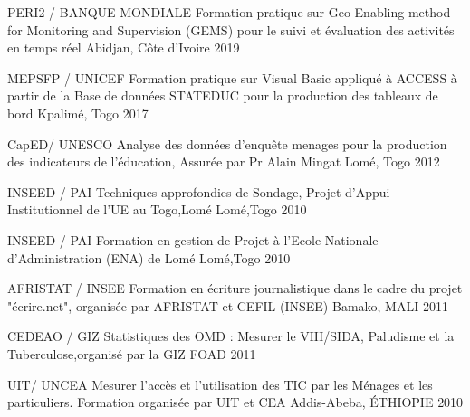 

\begin{cvhonors}

  \cvhonor
    {PERI2 / BANQUE MONDIALE} %
    {Formation pratique sur Geo-Enabling method for Monitoring and Supervision (GEMS) pour le suivi et évaluation des activités en temps réel} %
    {Abidjan, Côte d'Ivoire} %
    {2019} %

  \cvhonor
    {MEPSFP / UNICEF} %
    {Formation pratique sur Visual Basic appliqué à ACCESS à partir de la Base de données STATEDUC pour la production des tableaux de bord} %
    {Kpalimé, Togo} %
    {2017} %

  \cvhonor
    {CapED/ UNESCO} %
    {Analyse des données d’enquête menages pour la production des indicateurs de l'éducation, Assurée par Pr Alain Mingat} %
    {Lomé, Togo} %
    {2012} %


  \cvhonor
    {INSEED / PAI} %
    {Techniques approfondies de Sondage, Projet d’Appui Institutionnel de l’UE au Togo,Lomé} %
    {Lomé,Togo} %
    {2010} %


  \cvhonor
    {INSEED / PAI} %
    {Formation en gestion de Projet à l'Ecole Nationale d'Administration (ENA) de Lomé} %
    {Lomé,Togo} %
    {2010} %

  \cvhonor
    {AFRISTAT / INSEE} %
    {Formation en écriture journalistique dans le cadre du projet "écrire.net", organisée par AFRISTAT et CEFIL (INSEE)} %
    {Bamako, MALI} %
    {2011} %

  \cvhonor
    {CEDEAO / GIZ} %
    {Statistiques des OMD : Mesurer le VIH/SIDA, Paludisme et la Tuberculose,organisé par la GIZ} %
    {FOAD} %
    {2011} %

  \cvhonor
    { UIT/ UNCEA} %
    {Mesurer l’accès et l’utilisation des TIC par les Ménages et les particuliers. Formation organisée par UIT et CEA} %
    {Addis-Abeba, ÉTHIOPIE} %
    {2010} %


\end{cvhonors}
